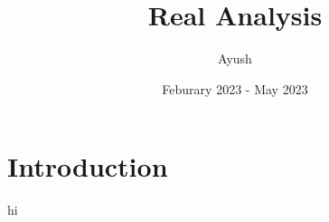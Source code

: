 \documentclass{article}
\title{Real Analysis}
\author{Ayush}
\date{Feburary 2023 - May 2023}
\begin{document}
\maketitle

\section*{Introduction}
hi
\end{document}

